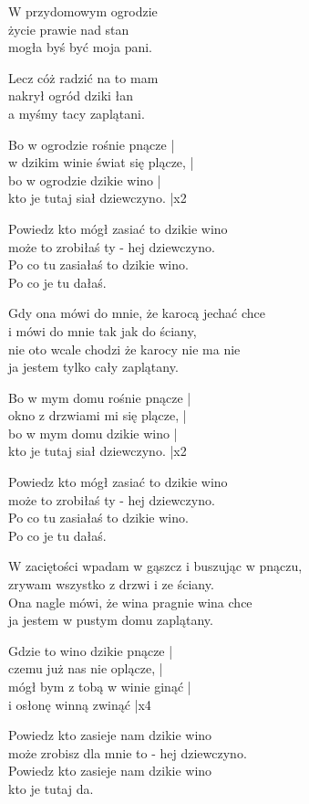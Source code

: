 \begin{text}
    W przydomowym ogrodzie\\
    życie prawie nad stan\\
    mogła byś być moja pani.

    Lecz cóż radzić na to mam\\
    nakrył ogród dziki łan\\
    a myśmy tacy zaplątani.

    \vin Bo w ogrodzie rośnie pnącze |\\
    \vin w dzikim winie świat się plącze, |\\
    \vin bo w ogrodzie dzikie wino |\\
    \vin kto je tutaj siał dziewczyno. |x2

    \vin Powiedz kto mógł zasiać to dzikie wino\\
    \vin może to zrobiłaś ty - hej dziewczyno.\\
    \vin Po co tu zasiałaś to dzikie wino.\\
    \vin Po co je tu dałaś.

    Gdy ona mówi do mnie, że karocą jechać chce\\
    i mówi do mnie tak jak do ściany,\\
    nie oto wcale chodzi że karocy nie ma nie\\
    ja jestem tylko cały zaplątany.

    \vin Bo w mym domu rośnie pnącze |\\
    \vin okno z drzwiami mi się plącze, | \\
    \vin bo w mym domu dzikie wino |\\
    \vin kto je tutaj siał dziewczyno. |x2

    \vin Powiedz kto mógł zasiać to dzikie wino\\
    \vin może to zrobiłaś ty - hej dziewczyno.\\
    \vin Po co tu zasiałaś to dzikie wino.\\
    \vin Po co je tu dałaś.

    W zaciętości wpadam w gąszcz i buszując w pnączu,\\
    zrywam wszystko z drzwi i ze ściany.\\
    Ona nagle mówi, że wina pragnie wina chce\\
    ja jestem w pustym domu zaplątany.

    \vin Gdzie to wino dzikie pnącze |\\
    \vin czemu już nas nie oplącze, |\\
    \vin mógł bym z tobą w winie ginąć |\\
    \vin i osłonę winną zwinąć |x4

    \vin Powiedz kto zasieje nam dzikie wino\\
    \vin może zrobisz dla mnie to - hej dziewczyno.\\
    \vin Powiedz kto zasieje nam dzikie wino\\
    \vin kto je tutaj da.
\end{text}
\begin{chord}

\end{chord}